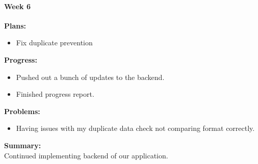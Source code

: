 \paragraph{Week 6}
\begin{adjustwidth}{2.5em}{0pt}
    \vspace{-0.5cm}\textbf{Plans:}
    \vspace{-0.5cm}
    \begin{itemize}
        \item Fix duplicate prevention
    \end{itemize} 
    \vspace{-0.3cm}\textbf{Progress:}
    \vspace{-0.5cm}
    \begin{itemize}
        \item Pushed out a bunch of updates to the backend. 
		\item Finished progress report. 
    \end{itemize} 
    \vspace{-0.3cm}\textbf{Problems:}
    \vspace{-0.5cm}
    \begin{itemize}
        \item Having issues with my duplicate data check not comparing format correctly.
    \end{itemize}  
    \vspace{-0.3cm}\noindent\textbf{Summary:}\\
    \noindent Continued implementing backend of our application.
\end{adjustwidth} 
